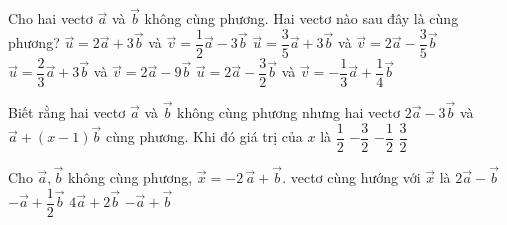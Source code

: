 \begin{ex}%
	Cho hai vectơ $\overrightarrow a $ và $\overrightarrow b $ không cùng phương. Hai vectơ nào sau đây là cùng phương?
	\choice
	{$\overrightarrow u=2\overrightarrow a+3\overrightarrow b $ và $\overrightarrow v=\dfrac{1}{2}\overrightarrow a-3\overrightarrow b $}
	{$\overrightarrow u=\dfrac{3}{5}\overrightarrow a+3\overrightarrow b $ và $\overrightarrow v=2\overrightarrow a-\dfrac{3}{5}\overrightarrow b $}
	{$\overrightarrow u=\dfrac{2}{3}\overrightarrow a+3\overrightarrow b $ và $\overrightarrow v=2\overrightarrow a-9\overrightarrow b $}
	{\True $\overrightarrow u=2\overrightarrow a-\dfrac{3}{2}\overrightarrow b $ và $\overrightarrow v=-\dfrac{1}{3}\overrightarrow a+\dfrac{1}{4}\overrightarrow b $}
\end{ex}

\begin{ex}%
	Biết rằng hai vectơ $\overrightarrow a $ và $\overrightarrow b $ không cùng phương nhưng hai vectơ $ 2\overrightarrow a-3\overrightarrow b $ và $\overrightarrow a+\left(x-1\right)\overrightarrow b $ cùng phương. Khi đó giá trị của $ x$ là
	\choice
	{$\dfrac{1}{2}$}
	{$-\dfrac{3}{2}$}
	{\True $-\dfrac{1}{2}$}
	{$\dfrac{3}{2}$}
\end{ex}

\begin{ex}%
	Cho $\overrightarrow a, \overrightarrow b $ không cùng phương, $\overrightarrow{x }=-2\,\overrightarrow{a}+\overrightarrow{b}$. vectơ cùng hướng với $\overrightarrow{x}$ là
	\choice
	{$2 \overrightarrow{a}-\overrightarrow{b}$}
	{\True $-\overrightarrow{a}+\dfrac{1}{2}\overrightarrow{b}$}
	{$4 \overrightarrow{a}+2\overrightarrow{b}$}
	{$- \overrightarrow{a}+\overrightarrow{b}$}
\end{ex}

